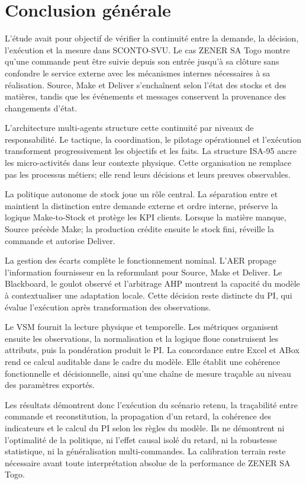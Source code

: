 \section{Conclusion générale}

L'étude avait pour objectif de vérifier la continuité entre la demande, la décision, l'exécution et la mesure dans SCONTO-SVU. Le cas ZENER SA Togo montre qu'une commande peut être suivie depuis son entrée jusqu'à sa clôture sans confondre le service externe avec les mécanismes internes nécessaires à sa réalisation. Source, Make et Deliver s'enchaînent selon l'état des stocks et des matières, tandis que les événements et messages conservent la provenance des changements d'état.

L'architecture multi-agents structure cette continuité par niveaux de responsabilité. Le tactique, la coordination, le pilotage opérationnel et l'exécution transforment progressivement les objectifs et les faits. La structure ISA-95 ancre les micro-activités dans leur contexte physique. Cette organisation ne remplace pas les processus métiers; elle rend leurs décisions et leurs preuves observables.

La politique autonome de stock joue un rôle central. La séparation entre  et  maintient la distinction entre demande externe et ordre interne, préserve la logique Make-to-Stock et protège les KPI clients. Lorsque la matière manque, Source précède Make; la production crédite ensuite le stock fini, réveille la commande et autorise Deliver.

La gestion des écarts complète le fonctionnement nominal. L'AER propage l'information fournisseur en la reformulant pour Source, Make et Deliver. Le Blackboard, le goulot observé et l'arbitrage AHP montrent la capacité du modèle à contextualiser une adaptation locale. Cette décision reste distincte du PI, qui évalue l'exécution après transformation des observations.

Le VSM fournit la lecture physique et temporelle. Les métriques organisent ensuite les observations, la normalisation et la logique floue construisent les attributs, puis la pondération produit le PI. La concordance entre Excel et ABox rend ce calcul auditable dans le cadre du modèle. Elle établit une cohérence fonctionnelle et décisionnelle, ainsi qu'une chaîne de mesure traçable au niveau des paramètres exportés.

Les résultats démontrent donc l'exécution du scénario retenu, la traçabilité entre commande et reconstitution, la propagation d'un retard, la cohérence des indicateurs et le calcul du PI selon les règles du modèle. Ils ne démontrent ni l'optimalité de la politique, ni l'effet causal isolé du retard, ni la robustesse statistique, ni la généralisation multi-commandes. La calibration terrain reste nécessaire avant toute interprétation absolue de la performance de ZENER SA Togo.
